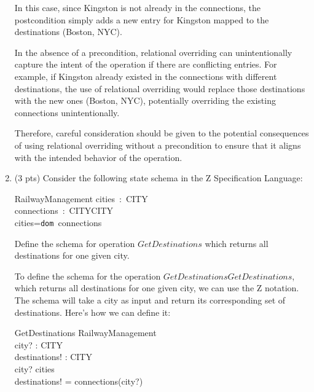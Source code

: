 \documentclass[12pt]{article}
\begin{document}
\begin{spacing}{1.5}
\begin{enumerate}
        In this case, since Kingston is not already in the connections, the postcondition simply adds a new entry for Kingston mapped to the destinations (Boston, NYC).

        In the absence of a precondition, relational overriding can unintentionally capture the intent of the operation if there are conflicting entries. For example, if Kingston already existed in the connections with different destinations, the use of relational overriding would replace those destinations with the new ones (Boston, NYC), potentially overriding the existing connections unintentionally.
        
        Therefore, careful consideration should be given to the potential consequences of using relational overriding without a precondition to ensure that it aligns with the intended behavior of the operation.
  
        \item (3 pts) Consider the following state schema in the Z Specification Language:

        \begin{schema}{RailwayManagement}
        cities~:~CITY\\
        connections~:~CITY\nrightarrow{}CITY\\
        \where
        cities=\texttt{dom }connections
        \end{schema}
		      
        Define the schema for operation $GetDestinations$ which returns all destinations for one given city.

        To define the schema for the operation $GetDestinationsGetDestinations$, which returns all destinations for one given city, we can use the Z notation. The schema will take a city as input and return its corresponding set of destinations. Here's how we can define it:

        \begin{schema}{GetDestinations}
        \Delta RailwayManagement \\
        city? : CITY \\
        destinations! : CITY \\
        \where
        city? \in cities \\
        destinations! = connections(city?) \\
        \end{schema}


\end{enumerate}
\end{spacing}
\end{document}
